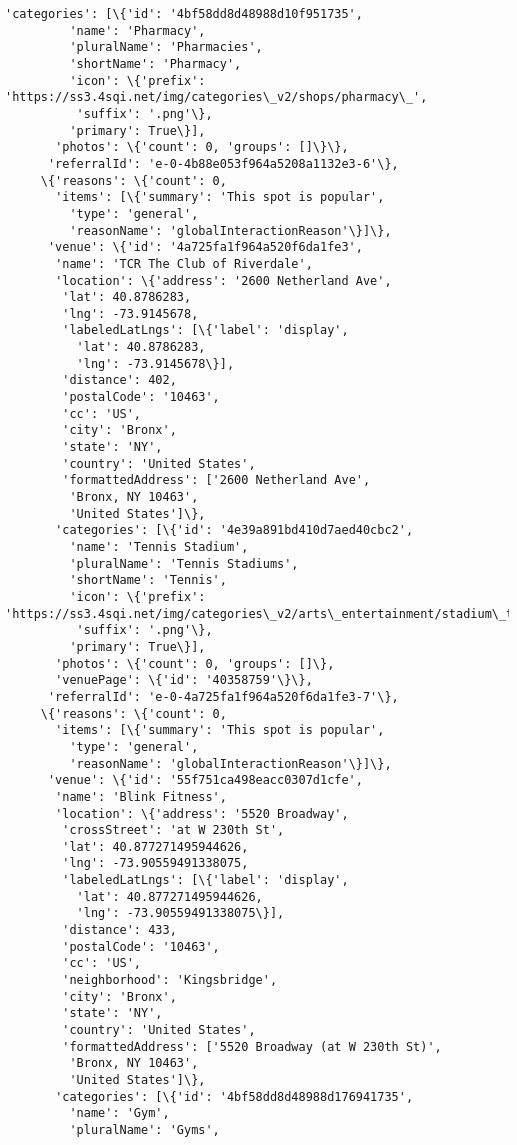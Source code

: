 \documentclass[11pt]{article}
\begin{document}
\begin{tcolorbox}[breakable, size=fbox, boxrule=.5pt, pad at break*=1mm, opacityfill=0]
\begin{Verbatim}[commandchars=\\\{\}]
       'categories': [\{'id': '4bf58dd8d48988d10f951735',
         'name': 'Pharmacy',
         'pluralName': 'Pharmacies',
         'shortName': 'Pharmacy',
         'icon': \{'prefix':
'https://ss3.4sqi.net/img/categories\_v2/shops/pharmacy\_',
          'suffix': '.png'\},
         'primary': True\}],
       'photos': \{'count': 0, 'groups': []\}\},
      'referralId': 'e-0-4b88e053f964a5208a1132e3-6'\},
     \{'reasons': \{'count': 0,
       'items': [\{'summary': 'This spot is popular',
         'type': 'general',
         'reasonName': 'globalInteractionReason'\}]\},
      'venue': \{'id': '4a725fa1f964a520f6da1fe3',
       'name': 'TCR The Club of Riverdale',
       'location': \{'address': '2600 Netherland Ave',
        'lat': 40.8786283,
        'lng': -73.9145678,
        'labeledLatLngs': [\{'label': 'display',
          'lat': 40.8786283,
          'lng': -73.9145678\}],
        'distance': 402,
        'postalCode': '10463',
        'cc': 'US',
        'city': 'Bronx',
        'state': 'NY',
        'country': 'United States',
        'formattedAddress': ['2600 Netherland Ave',
         'Bronx, NY 10463',
         'United States']\},
       'categories': [\{'id': '4e39a891bd410d7aed40cbc2',
         'name': 'Tennis Stadium',
         'pluralName': 'Tennis Stadiums',
         'shortName': 'Tennis',
         'icon': \{'prefix':
'https://ss3.4sqi.net/img/categories\_v2/arts\_entertainment/stadium\_tennis\_',
          'suffix': '.png'\},
         'primary': True\}],
       'photos': \{'count': 0, 'groups': []\},
       'venuePage': \{'id': '40358759'\}\},
      'referralId': 'e-0-4a725fa1f964a520f6da1fe3-7'\},
     \{'reasons': \{'count': 0,
       'items': [\{'summary': 'This spot is popular',
         'type': 'general',
         'reasonName': 'globalInteractionReason'\}]\},
      'venue': \{'id': '55f751ca498eacc0307d1cfe',
       'name': 'Blink Fitness',
       'location': \{'address': '5520 Broadway',
        'crossStreet': 'at W 230th St',
        'lat': 40.877271495944626,
        'lng': -73.90559491338075,
        'labeledLatLngs': [\{'label': 'display',
          'lat': 40.877271495944626,
          'lng': -73.90559491338075\}],
        'distance': 433,
        'postalCode': '10463',
        'cc': 'US',
        'neighborhood': 'Kingsbridge',
        'city': 'Bronx',
        'state': 'NY',
        'country': 'United States',
        'formattedAddress': ['5520 Broadway (at W 230th St)',
         'Bronx, NY 10463',
         'United States']\},
       'categories': [\{'id': '4bf58dd8d48988d176941735',
         'name': 'Gym',
         'pluralName': 'Gyms',

\end{Verbatim}
\end{tcolorbox}
\end{document}
